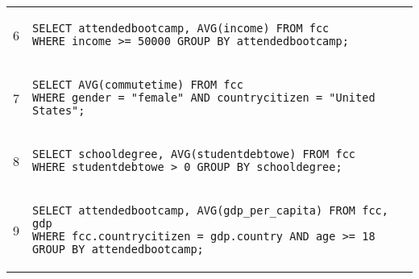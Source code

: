 \begin{tabular}{cl}
\midrule
6 & 
\begin{minipage}{6in}
\begin{lstlisting}[breaklines]
SELECT attendedbootcamp, AVG(income) FROM fcc
WHERE income >= 50000 GROUP BY attendedbootcamp;
\end{lstlisting}
\end{minipage}{queryno} \label[query]{q6} \\
7 & 
\begin{minipage}{6in}
\begin{lstlisting}[breaklines]
SELECT AVG(commutetime) FROM fcc
WHERE gender = "female" AND countrycitizen = "United States";
\end{lstlisting}
\end{minipage}{queryno} \label[query]{q7} \\
8 & 
\begin{minipage}{6in}
\begin{lstlisting}[breaklines]
SELECT schooldegree, AVG(studentdebtowe) FROM fcc
WHERE studentdebtowe > 0 GROUP BY schooldegree;
\end{lstlisting}
\end{minipage}{queryno} \label[query]{q8}\\
9 & 
\begin{minipage}{6in}
\begin{lstlisting}[breaklines]
SELECT attendedbootcamp, AVG(gdp_per_capita) FROM fcc, gdp
WHERE fcc.countrycitizen = gdp.country AND age >= 18
GROUP BY attendedbootcamp;
\end{lstlisting}
\end{minipage}{queryno} \label[query]{q9}\\
\bottomrule
\end{tabular}

